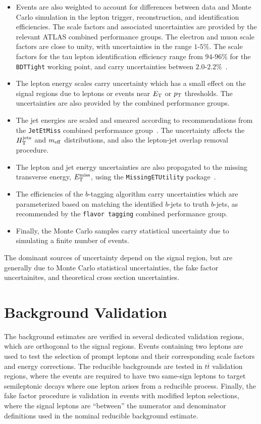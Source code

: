 \begin{itemize}
	\item Events are also weighted to account for differences between data and Monte Carlo simulation in the lepton trigger, reconstruction, and identification efficiencies. The scale factors and associated uncertainties are provided by the relevant ATLAS combined performance groups. The electron and muon scale factors are close to unity, with uncertainties in the range $1$-$5\%$. The scale factors for the tau lepton identification efficiency range from $94$-$96\%$ for the \texttt{BDTTight} working point, and carry uncertainties between $2.0$-$2.2\%$~\cite{TauUncertainties}.

	\item The lepton energy scales carry uncertainty which has a small effect on the signal regions due to leptons or events near $E_{\mathrm{T}}$ or $p_{\text{T}}$ thresholds. The uncertainties are also provided by the combined performance groups.

	\item  The jet energies are scaled and smeared according to recommendations from the \texttt{JetEtMiss} combined performance group~\cite{JES,JER}. The uncertainty affects the $H_{\mathrm{T}}^{\mathrm{jets}}$ and $m_{\mathrm{eff}}$ distributions, and also the lepton-jet overlap removal procedure.

	\item The lepton and jet energy uncertainties are also propagated to the missing transverse energy, $E_{\text{T}}^{\text{miss}}$, using the \texttt{MissingETUtility} package~\cite{METUtility}. 

	\item The efficiencies of the $b$-tagging algorithm carry uncertainties which are parameterized based on matching the identified $b$-jets to truth $b$-jets, as recommended by the \texttt{flavor tagging} combined performance group.

	\item Finally, the Monte Carlo samples carry statistical uncertainty due to simulating a finite number of events. 
\end{itemize}

The dominant sources of uncertainty depend on the signal region, but are generally due to Monte Carlo statistical uncertainties, the fake factor uncertainites, and theoretical cross section uncertainties. 

\section{Background Validation}\label{sec:model-independent-validation-regions}
The background estimates are verified in several dedicated validation regions, which are orthogonal to the signal regions. Events containing two leptons are used to test the selection of prompt leptons and their corresponding scale factors and energy corrections. The reducible backgrounds are tested in $t\overline{t}$ validation regions, where the events are required to have two same-sign leptons to target semileptonic decays where one lepton arises from a reducible process. Finally, the fake factor procedure is validation in events with modified lepton selections, where the signal leptons are ``between'' the numerator and denominator definitions used in the nominal reducible background estimate.

